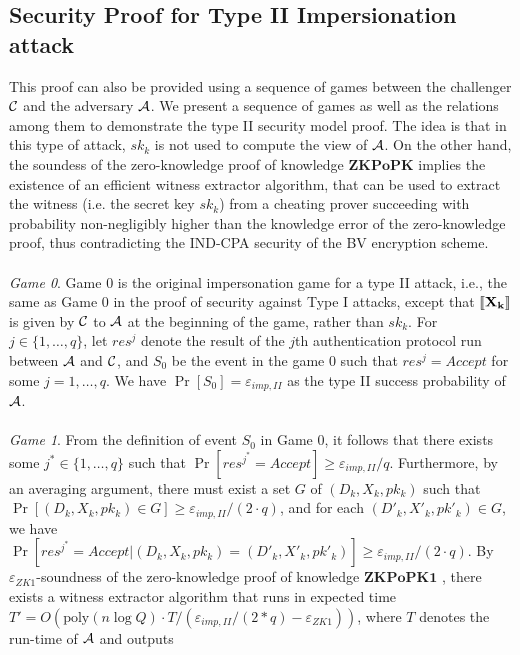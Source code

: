 \subsection{Security Proof for Type II Impersionation attack}
\label{append:ProofsTypeII}
This proof can also be provided using a sequence of games between the challenger
$\mathcal{C}$ and the adversary $\mathcal{A}$. We present a sequence of games as
well as the relations among them to demonstrate the type II security model
proof. The idea is that in this type of attack, $sk_k$ is not used to compute
the view of $\mathcal{A}$.  On the other hand, the soundess of the zero-knowledge
proof of knowledge $\mathbf{ZKPoPK}$ implies the existence of an efficient
witness extractor algorithm, that can be used to extract the witness (i.e. the
secret key $sk_k$) from a cheating prover succeeding with probability
non-negligibly higher than the knowledge error of the zero-knowledge proof, thus
contradicting the IND-CPA security of the BV encryption scheme.
\\\\
\textit{Game 0}. Game 0 is the original impersonation game for a type II attack,
i.e., the same as Game 0 in the proof of security against Type I attacks, except
that $\left\llbracket\mathbf{X_{k}}\right\rrbracket$ is given by $\mathcal{C}$ to $\mathcal{A}$ at the
beginning of the game, rather than $sk_k$.  For $j \in \{1,\ldots,q\}$, let
$res^{j}$ denote the result of the $j$th authentication protocol run between
$\mathcal{A}$ and $\mathcal{C}$, and $S_0$ be
the event in the game $0$ such that $res^{j} = Accept$ for some $j=1,\ldots,q$. We have $\Pr[S_0] = \varepsilon_{imp,II}$ as the type II success probability of $\mathcal{A}$. \\\\
\textit{Game 1}. From the definition of event $S_0$ in Game 0, it follows that
there exists some $j^* \in \{1,\ldots,q\}$ such that
$\Pr[res^{j^*} = Accept] \geq \varepsilon_{imp,II}/q$. Furthermore, by an
averaging argument, there must exist a set $G$ of $(D_k,X_k,pk_k)$ such that
$\Pr[(D_k,X_k,pk_k) \in G] \geq \varepsilon_{imp,II}/(2 \cdot q)$, and for each
$(D'_k,X'_k,pk'_k) \in G$, we have
$\Pr[res^{j^*} = Accept |(D_k,X_k,pk_k)=(D'_k,X'_k,pk'_k)] \geq
\varepsilon_{imp,II}/(2 \cdot q)$. By $\varepsilon_{ZK1}$-soundness of the
zero-knowledge proof of knowledge $\mathbf{ZKPoPK1}$
\cite{goldreich2009foundations}, there exists a witness extractor algorithm that
runs in expected time
$T'=O(\mathrm{poly}(n \log Q) \cdot T / (\varepsilon_{imp,II}/(2*q) -
\varepsilon_{ZK1}))$, where $T$ denotes the run-time of $\mathcal{A}$ and outputs
